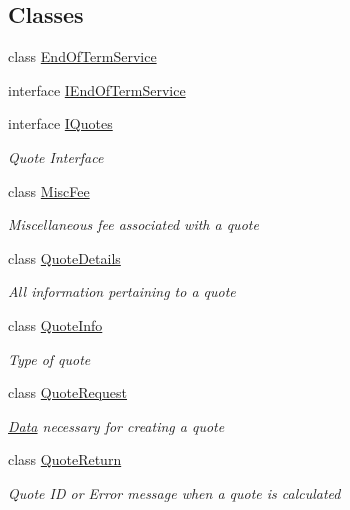 \subsection*{Classes}
\begin{DoxyCompactItemize}
\item 
class \mbox{\hyperlink{class_g_f_s_c_1_1_services_1_1_end_of_term_1_1_end_of_term_service}{End\+Of\+Term\+Service}}
\item 
interface \mbox{\hyperlink{interface_g_f_s_c_1_1_services_1_1_end_of_term_1_1_i_end_of_term_service}{I\+End\+Of\+Term\+Service}}
\item 
interface \mbox{\hyperlink{interface_g_f_s_c_1_1_services_1_1_end_of_term_1_1_i_quotes}{I\+Quotes}}
\begin{DoxyCompactList}\small\item\em Quote Interface \end{DoxyCompactList}\item 
class \mbox{\hyperlink{class_g_f_s_c_1_1_services_1_1_end_of_term_1_1_misc_fee}{Misc\+Fee}}
\begin{DoxyCompactList}\small\item\em Miscellaneous fee associated with a quote \end{DoxyCompactList}\item 
class \mbox{\hyperlink{class_g_f_s_c_1_1_services_1_1_end_of_term_1_1_quote_details}{Quote\+Details}}
\begin{DoxyCompactList}\small\item\em All information pertaining to a quote \end{DoxyCompactList}\item 
class \mbox{\hyperlink{class_g_f_s_c_1_1_services_1_1_end_of_term_1_1_quote_info}{Quote\+Info}}
\begin{DoxyCompactList}\small\item\em Type of quote \end{DoxyCompactList}\item 
class \mbox{\hyperlink{class_g_f_s_c_1_1_services_1_1_end_of_term_1_1_quote_request}{Quote\+Request}}
\begin{DoxyCompactList}\small\item\em \mbox{\hyperlink{namespace_g_f_s_c_1_1_services_1_1_end_of_term_1_1_data}{Data}} necessary for creating a quote \end{DoxyCompactList}\item 
class \mbox{\hyperlink{class_g_f_s_c_1_1_services_1_1_end_of_term_1_1_quote_return}{Quote\+Return}}
\begin{DoxyCompactList}\small\item\em Quote ID or Error message when a quote is calculated \end{DoxyCompactList}\item 

\end{DoxyCompactItemize}
